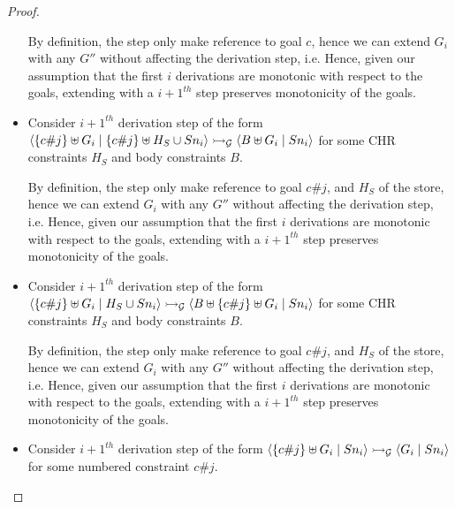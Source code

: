 \documentclass{tlp}
\begin{document}
\begin{proof}
\begin{itemize}
	        By definition, the  step only make reference to goal $c$, hence we can
	        extend $G_i$ with any $G''$ without affecting the derivation step, i.e.
	           \goaltrans 
	        \eda
	        Hence, given our assumption that the first $i$ derivations are monotonic with respect
          to the goals,	extending with a $i+1^{th}$  step preserves monotonicity
          of the goals. 
	  \item {} Consider $i+1^{th}$ derivation step of the form 
	        $\langle \{c\#j\} \uplus G_i\mid\{c\#j\} \uplus H_S \cup Sn_i \rangle 
	         \rightarrowtail_{\cal G} 
	         \langle B \uplus G_i\mid Sn_i \rangle$
	        for some CHR constraints $H_S$ and body constraints $B$.
	        
	        By definition, the  step only make reference to goal $c\#j$, and $H_S$ of the
	        store, hence we can extend $G_i$ with any $G''$ without affecting the derivation step, i.e.
	           \goaltrans 
	        \eda
	        Hence, given our assumption that the first $i$ derivations are monotonic with respect
          to the goals,	extending with a $i+1^{th}$  step preserves monotonicity
          of the goals. 
	  \item {} Consider $i+1^{th}$ derivation step of the form 
	        $\langle \{c\#j\} \uplus G_i\mid H_S \cup Sn_i \rangle 
	         \rightarrowtail_{\cal G} 
	         \langle B \uplus \{c\#j\} \uplus G_i\mid Sn_i \rangle$
	        for some CHR constraints $H_S$ and body constraints $B$.
	        
	        By definition, the  step only make reference to goal $c\#j$, and $H_S$ of the
	        store, hence we can extend $G_i$ with any $G''$ without affecting the derivation step, i.e.
	           \goaltrans 
	        \eda
	        Hence, given our assumption that the first $i$ derivations are monotonic with respect
          to the goals,	extending with a $i+1^{th}$  step preserves monotonicity
          of the goals. 
	  \item {} Consider $i+1^{th}$ derivation step of the form 
	        $\langle \{c\#j\} \uplus G_i\mid Sn_i \rangle \rightarrowtail_{\cal G} \langle G_i\mid Sn_i \rangle$
	        for some numbered constraint $c\#j$.
	        

\end{itemize}
\end{proof}
\end{document}
